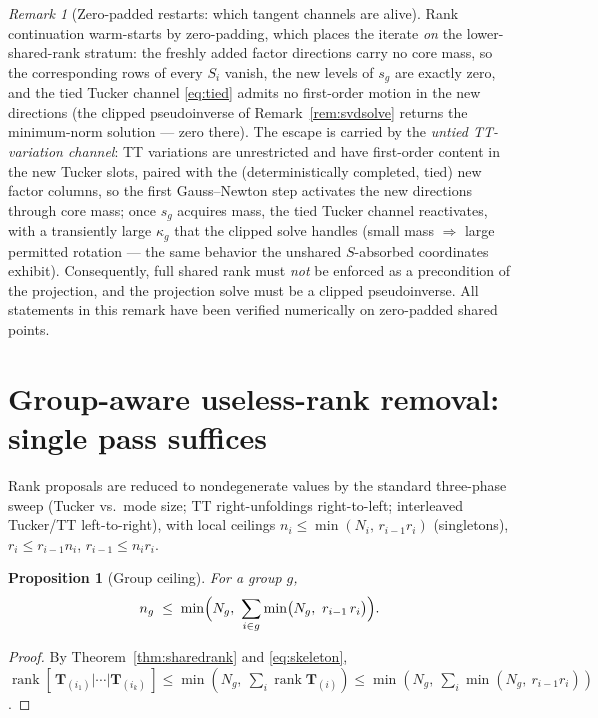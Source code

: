 \documentclass[11pt]{article}
\newtheorem{proposition}[theorem]{Proposition}
\theoremstyle{definition}
\theoremstyle{remark}
\newtheorem{remark}[theorem]{Remark}
\newcommand{\T}{\boldsymbol{T}}
\newcommand{\rank}{\operatorname{rank}}
\begin{document}
\begin{remark}[Zero-padded restarts: which tangent channels are alive]
\label{rem:restart}
Rank continuation warm-starts by zero-padding, which places the iterate
\emph{on} the lower-shared-rank stratum: the freshly added factor directions
carry no core mass, so the corresponding rows of every $S_i$ vanish, the new
levels of $s_g$ are exactly zero, and the tied Tucker channel
\eqref{eq:tied} admits no first-order motion in the new directions (the
clipped pseudoinverse of Remark~\ref{rem:svdsolve} returns the minimum-norm
solution --- zero there). The escape is carried by the \emph{untied
TT-variation channel}: TT variations are unrestricted and have first-order
content in the new Tucker slots, paired with the (deterministically completed,
tied) new factor columns, so the first Gauss--Newton step activates the new
directions through core mass; once $s_g$ acquires mass, the tied Tucker
channel reactivates, with a transiently large $\kappa_g$ that the clipped
solve handles (small mass $\Rightarrow$ large permitted rotation --- the
same behavior the unshared $S$-absorbed coordinates exhibit). Consequently,
full shared rank must \emph{not} be enforced as a precondition of the
projection, and the projection solve must be a clipped pseudoinverse. All
statements in this remark have been verified numerically on zero-padded
shared points.
\end{remark}

\section{Group-aware useless-rank removal: single pass suffices}
\label{sec:removal}

Rank proposals are reduced to nondegenerate values by the standard
three-phase sweep (Tucker vs.\ mode size; TT right-unfoldings right-to-left;
interleaved Tucker/TT left-to-right), with local ceilings
$n_i \leq \min(N_i,\, r_{i-1} r_i)$ (singletons),
$r_i \leq r_{i-1} n_i$, $r_{i-1} \leq n_i r_i$.

\begin{proposition}[Group ceiling]\label{prop:ceiling}
For a group $g$,
\begin{equation}\label{eq:ceiling}
n_g \;\leq\;
\min\Bigl( N_g,\ \sum_{i \in g} \min\bigl( N_g,\ r_{i-1}\, r_i \bigr) \Bigr).
\end{equation}
\end{proposition}

\begin{proof}
By Theorem~\ref{thm:sharedrank} and \eqref{eq:skeleton},
$\rank[\,\T_{(i_1)}|\cdots|\T_{(i_k)}\,]
\leq \min(N_g,\ \sum_i \rank \T_{(i)})
\leq \min(N_g,\ \sum_i \min(N_g,\ r_{i-1} r_i))$.
\end{proof}
\end{document}
